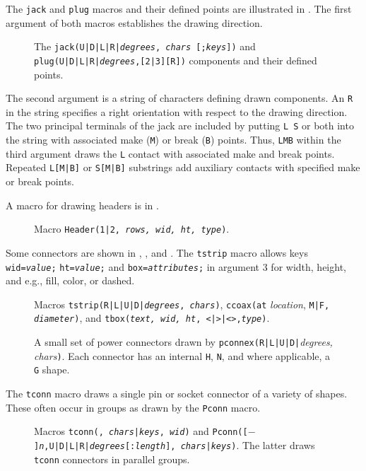 The {\tt jack} and {\tt plug} macros and their defined points are
illustrated in .
The first argument of both macros establishes the drawing direction.
\begin{figure}[H]
   
   \vspace{-1ex}
   \caption{The {\tt jack(U|D|L|R|{\sl degrees}, {\sl chars} [;{\sl keys}])}
    and {\tt plug(U|D|L|R|{\sl degrees},[2|3][R])} components
    and their defined points.}
   \label{Jack}
   \end{figure}
\noindent%
\enlargethispage{\baselineskip}
 The second argument is a string of characters defining drawn components.
 An {\tt R} in the string specifies a
 right orientation with respect to the drawing direction.
 The two principal terminals of
 the jack are included by putting \hbox{{\tt L} {\tt S}}
 or both into the string with associated make ({\tt M})
 or break ({\tt B}) points.  Thus, {\tt LMB} within the third
 argument draws the {\tt L} contact with
 associated make and break points. Repeated {\tt L[M|B]}
 or {\tt S[M|B]} substrings add auxiliary contacts with 
 specified make or break points.


A macro for drawing headers is in .
\begin{figure}[H]
   
   \caption{Macro {\tt Header(1|2, {\sl rows, wid, ht, type})}.}
   \label{Headers}
   \end{figure}

Some connectors are shown in , , and .
The {\tt tstrip} macro allows keys
 {\tt wid={\sl{}value};}
 {\tt ht={\sl{}value};} and
 {\tt box={\sl{}attributes};}
 in argument 3 for width, height, and e.g., fill, color, or dashed.
\begin{figure}[H]
   
   \caption{Macros {\tt tstrip(R|L|U|D|{\sl degrees}, {\sl chars})},
     {\tt ccoax(at} {\sl location}, {\tt M|F, {\sl diameter})},
     and
     {\tt tbox({\sl text, wid, ht}, <|>|<>,{\sl type})}.}
   \label{Tstrip}
   \end{figure}
\begin{figure}[H]
   
   \caption{A small set of power connectors drawn by
    {\tt pconnex(R|L|U|D|}{\sl degrees, chars}{\tt)}. Each connector has
    an internal {\tt H}, {\tt N}, and where applicable, a {\tt G} shape.}
   \label{Pconn}
   \end{figure}
The {\tt tconn} macro draws a single pin or socket connector of a variety of
shapes.  These often occur in groups as drawn by the {\tt Pconn} macro.
\begin{figure}[H]
   
   \caption{Macros 
     {\tt tconn(\linespec, {\sl chars}|{\sl keys}, {\sl wid})} and
     {\tt Pconn([$-$]{\sl n},U|D|L|R|{\sl degrees}[:{\sl length}],
  {\sl chars}|{\sl keys})}. The latter draws {\tt tconn} connectors
  in parallel groups.}
   \label{Conn}
   \end{figure}

